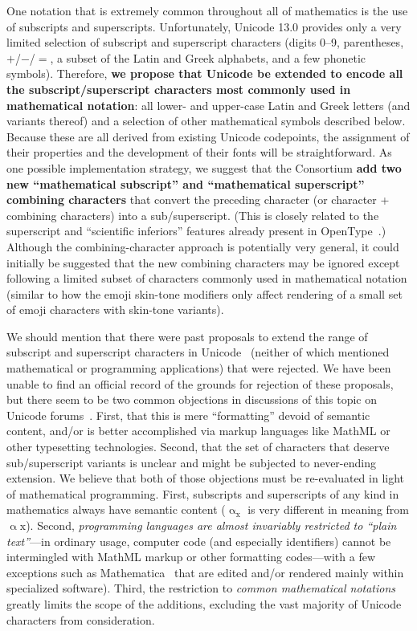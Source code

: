 \documentclass[10pt,english]{article}
\begin{document}
One notation that is extremely common throughout all of mathematics
is the use of subscripts and superscripts. Unfortunately, Unicode
13.0 provides only a very limited selection of subscript and superscript
characters (digits 0--9, parentheses, $+$/$-$/$=$, a subset of
the Latin and Greek alphabets, and a few phonetic symbols). Therefore,\textbf{
we propose that Unicode be extended to encode all the subscript/superscript
characters most commonly used in mathematical notation}: all lower-
and upper-case Latin and Greek letters (and variants thereof) and
a selection of other mathematical symbols described below. Because
these are all derived from existing Unicode codepoints, the assignment
of their properties and the development of their fonts will be straightforward.
As one possible implementation strategy, we suggest that the Consortium
\textbf{add two new ``mathematical subscript'' and ``mathematical
superscript'' combining characters} that convert the preceding character
(or character + combining characters) into a sub/superscript. (This is
closely related to the superscript and ``scientific
inferiors'' features already present in OpenType~\cite{OpenType}.)
Although the combining-character approach is potentially very general, it could
initially be suggested that the new combining characters may be ignored
except following a limited subset of characters commonly used in
mathematical notation (similar to how the emoji skin-tone modifiers only affect
rendering of a small set of emoji characters with skin-tone variants).

We should mention that there were past proposals to extend the range
of subscript and superscript characters in Unicode~\cite{L2-10-230,L2-11-208}
(neither of which mentioned mathematical or programming applications)
that were rejected. We have been unable to find an official record
of the grounds for rejection of these proposals, but there seem to
be two common objections in discussions of this topic on Unicode forums~\cite{Miller10,UCDF}.
First, that this is mere ``formatting''
devoid of semantic content, and/or is better accomplished via markup
languages like MathML or other typesetting technologies. Second, that
the set of characters that deserve sub/superscript variants is unclear
and might be subjected to never-ending extension. We believe that
both of those objections must be re-evaluated in light of mathematical
programming. First, subscripts and superscripts of any kind in mathematics
always have semantic content ($\mathrm{{\upalpha_{x}}}$ is very different
in meaning from $\mathrm{\upalpha\mathrm{{x}}}$). Second, \emph{programming
languages are almost invariably restricted to ``plain text''}---in
ordinary usage, computer code (and especially identifiers) cannot
be intermingled with MathML markup or other formatting codes---with
a few exceptions such as Mathematica~\cite{Mathematica} that are
edited and/or rendered mainly within specialized software). Third,
the restriction to
\emph{common mathematical notations} greatly limits the scope
of the additions, excluding the vast majority of Unicode characters
from consideration.
\end{document}
